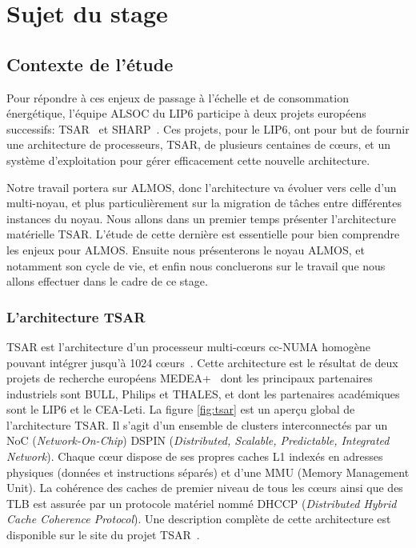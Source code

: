 \chapter{Sujet du stage}
\label{chap:subject}

  \section{Contexte de l'étude}

    Pour répondre à ces enjeux de passage à l'échelle et de consommation
    énergétique, l'équipe ALSOC du LIP6 participe à deux projets européens
    successifs: TSAR~\cite{tsar2008} et SHARP~\cite{sharp2012}. Ces projets,
    pour le LIP6, ont pour but de fournir une architecture de processeurs, TSAR,
    de plusieurs centaines de c\oe urs, et un système d'exploitation pour gérer
    efficacement cette nouvelle architecture.

    Notre travail portera sur ALMOS, donc l'architecture va évoluer vers celle
    d'un multi-noyau, et plus particulièrement sur la migration de tâches entre
    différentes instances du noyau. Nous allons dans un premier temps présenter
    l'architecture matérielle TSAR. L'étude de cette dernière est essentielle
    pour bien comprendre les enjeux pour ALMOS. Ensuite nous présenterons le
    noyau ALMOS, et notamment son cycle de vie, et enfin nous concluerons sur le
    travail que nous allons effectuer dans le cadre de ce stage.
  

    \subsection{L'architecture TSAR}
    \label{sec:tsar}

      TSAR est l'architecture d’un processeur multi-c\oe urs cc-NUMA homogène
      pouvant intégrer jusqu’à 1024 c\oe urs~\cite{greiner2009tsar}. Cette
      architecture est le résultat de deux projets de recherche européens
      MEDEA+~\cite{tsar2008,sharp2012} dont les principaux partenaires
      industriels sont BULL, Philips et THALES, et dont les partenaires
      académiques sont le LIP6 et le CEA-Leti. La figure \ref{fig:tsar} est un
      aperçu global de l'architecture TSAR. Il s'agit d'un ensemble de clusters
      interconnectés par un NoC (\textit{Network-On-Chip}) DSPIN
      (\textit{Distributed, Scalable, Predictable, Integrated Network}). Chaque
      c\oe ur dispose de ses propres caches L1 indexés en adresses physiques
      (données et instructions séparés) et d'une MMU (Memory Management
      Unit). La cohérence des caches de premier niveau de tous les c\oe urs
      ainsi que des TLB est assurée par un protocole matériel nommé DHCCP
      (\textit{Distributed Hybrid Cache Coherence Protocol}). Une description
      complète de cette architecture est disponible sur le site du projet
      TSAR~\cite{tsar2008web}.

